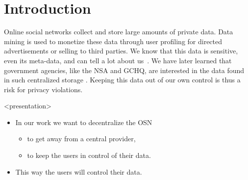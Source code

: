 \acresetall{}
\section{Introduction}


Online social networks collect and store large amounts of private data.
Data mining is used to monetize these data through user profiling for directed 
advertisements or selling to third parties.
We know that this data is sensitive, even its meta-data, and can tell a lot 
about us~\cite[e.g.][]{pregnancy}.
We have later learned that government agencies, like the \ac{NSA} and 
\ac{GCHQ}, are interested in the data found in such centralized storage 
\cite{prism}.
Keeping this data out of our own control is thus a risk for privacy violations.

\begin{frame}<presentation>
  \begin{itemize}

    \item In our work we want to decentralize the \ac{OSN}
      \begin{itemize}
        \item to get away from a central provider,
        \item to keep the users in control of their data.
      \end{itemize}

    \item This way the users will control their data.


  \end{itemize}
\end{frame}

